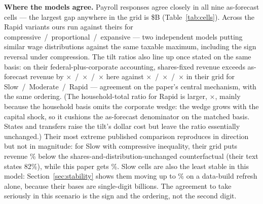 \textbf{Where the models agree.} Payroll responses agree closely in all nine
as-forecast cells --- the largest gap anywhere in the grid is
\$\genPayrollMaxCellGap B (Table~\ref{tab:cells}). Across the Rapid variants
ours run \genPayrollTripletOurs{} against theirs
\genPayrollTripletTheirs{} for compressive~/~proportional~/~expansive ---
two independent models putting similar wage distributions against the same
taxable maximum, including the sign reversal under compression. The tilt
ratios also line up once stated on the same basis: on their
federal-plus-corporate accounting, shares-fixed revenue exceeds as-forecast
revenue by
\genTiltOursMatchedSlow$\times$~/~\genTiltOursMatchedMod$\times$~/~\genTiltOursMatchedRapid$\times$
here against
\genTiltTheirsSlow$\times$~/~\genTiltTheirsMod$\times$~/~\genTiltTheirsRapid$\times$
in their grid for Slow~/~Moderate~/~Rapid --- agreement on the paper's
central mechanism, with the same ordering. (The household-total ratio for
Rapid is larger, \genTiltOursHouseholdRapid$\times$, mainly because the
household basis omits the corporate wedge: the wedge grows with the capital
shock, so it cushions the as-forecast denominator on the matched basis.
States and transfers raise the tilt's dollar cost but leave the ratio
essentially unchanged.) Their most extreme published comparison
reproduces in direction but not in magnitude: for Slow with compressive
inequality, their grid puts revenue \genSlowCompTheirsLowerPct\% below the
shares-and-distribution-unchanged counterfactual (their text states 82\%),
while this paper gets \genSlowCompOursLowerPct\%. Slow cells are
also the least stable in this model: Section~\ref{sec:stability} shows them
moving up to \genStabMaxRelPct\% on a data-build refresh alone, because
their bases are single-digit billions. The agreement to take seriously in
this scenario is the sign and the ordering, not the second digit.

\begin{table}[t]
\centering
\small
\tabPayrollCells
\caption{Cell-level comparison on the matched federal basis, all nine
as-forecast cells, \$B, 2030.}
\label{tab:cells}
\end{table}

